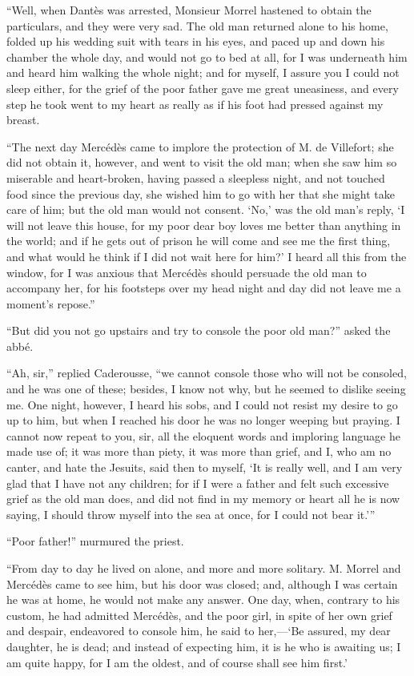 “Well, when Dantès was arrested, Monsieur Morrel hastened to obtain the
particulars, and they were very sad. The old man returned alone to his
home, folded up his wedding suit with tears in his eyes, and paced up
and down his chamber the whole day, and would not go to bed at all, for
I was underneath him and heard him walking the whole night; and for
myself, I assure you I could not sleep either, for the grief of the
poor father gave me great uneasiness, and every step he took went to my
heart as really as if his foot had pressed against my breast.

“The next day Mercédès came to implore the protection of M. de
Villefort; she did not obtain it, however, and went to visit the old
man; when she saw him so miserable and heart-broken, having passed a
sleepless night, and not touched food since the previous day, she
wished him to go with her that she might take care of him; but the old
man would not consent. ‘No,’ was the old man’s reply, ‘I will not leave
this house, for my poor dear boy loves me better than anything in the
world; and if he gets out of prison he will come and see me the first
thing, and what would he think if I did not wait here for him?’ I heard
all this from the window, for I was anxious that Mercédès should
persuade the old man to accompany her, for his footsteps over my head
night and day did not leave me a moment’s repose.”

“But did you not go upstairs and try to console the poor old man?”
asked the abbé.

“Ah, sir,” replied Caderousse, “we cannot console those who will not be
consoled, and he was one of these; besides, I know not why, but he
seemed to dislike seeing me. One night, however, I heard his sobs, and
I could not resist my desire to go up to him, but when I reached his
door he was no longer weeping but praying. I cannot now repeat to you,
sir, all the eloquent words and imploring language he made use of; it
was more than piety, it was more than grief, and I, who am no canter,
and hate the Jesuits, said then to myself, ‘It is really well, and I am
very glad that I have not any children; for if I were a father and felt
such excessive grief as the old man does, and did not find in my memory
or heart all he is now saying, I should throw myself into the sea at
once, for I could not bear it.’”

“Poor father!” murmured the priest.

“From day to day he lived on alone, and more and more solitary. M.
Morrel and Mercédès came to see him, but his door was closed; and,
although I was certain he was at home, he would not make any answer.
One day, when, contrary to his custom, he had admitted Mercédès, and
the poor girl, in spite of her own grief and despair, endeavored to
console him, he said to her,—‘Be assured, my dear daughter, he is dead;
and instead of expecting him, it is he who is awaiting us; I am quite
happy, for I am the oldest, and of course shall see him first.’

